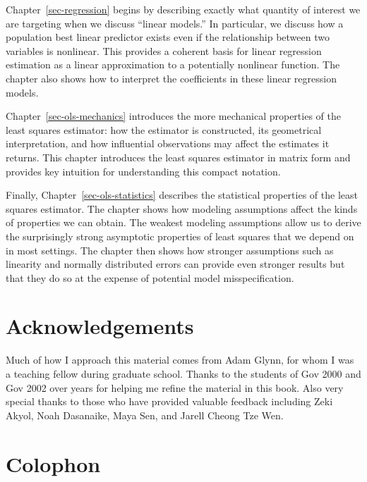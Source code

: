 \documentclass[
  13pt,
  letterpaper,
  DIV=11,
  numbers=noendperiod]{scrreprt}
\theoremstyle{definition}
\theoremstyle{definition}
\theoremstyle{plain}
\theoremstyle{remark}
\begin{document}
Chapter~\ref{sec-regression} begins by describing exactly what quantity
of interest we are targeting when we discuss ``linear models.'' In
particular, we discuss how a population best linear predictor exists
even if the relationship between two variables is nonlinear. This
provides a coherent basis for linear regression estimation as a linear
approximation to a potentially nonlinear function. The chapter also
shows how to interpret the coefficients in these linear regression
models.

Chapter~\ref{sec-ols-mechanics} introduces the more mechanical
properties of the least squares estimator: how the estimator is
constructed, its geometrical interpretation, and how influential
observations may affect the estimates it returns. This chapter
introduces the least squares estimator in matrix form and provides key
intuition for understanding this compact notation.

Finally, Chapter~\ref{sec-ols-statistics} describes the statistical
properties of the least squares estimator. The chapter shows how
modeling assumptions affect the kinds of properties we can obtain. The
weakest modeling assumptions allow us to derive the surprisingly strong
asymptotic properties of least squares that we depend on in most
settings. The chapter then shows how stronger assumptions such as
linearity and normally distributed errors can provide even stronger
results but that they do so at the expense of potential model
misspecification.

\section*{Acknowledgements}\label{acknowledgements}


Much of how I approach this material comes from Adam Glynn, for whom I
was a teaching fellow during graduate school. Thanks to the students of
Gov 2000 and Gov 2002 over years for helping me refine the material in
this book. Also very special thanks to those who have provided valuable
feedback including Zeki Akyol, Noah Dasanaike, Maya Sen, and Jarell
Cheong Tze Wen.

\section*{Colophon}\label{colophon}
\end{document}
